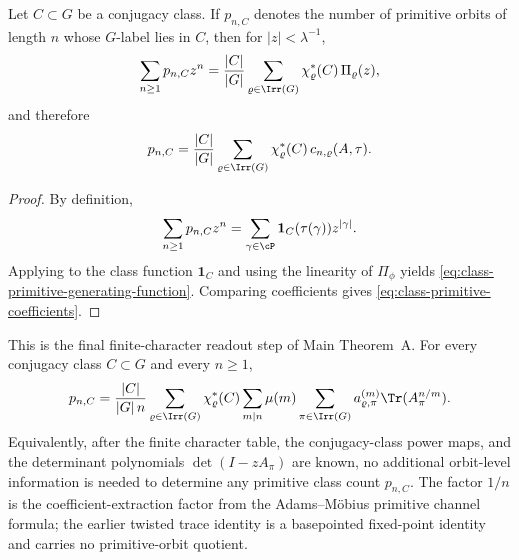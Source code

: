 \begin{proposition}
  \label{prop:class-primitive-decomposition}
  Let \(C\subset G\) be a conjugacy class. If \(p_{n,C}\) denotes the
  number of primitive orbits of length \(n\) whose \(G\)-label lies in
  \(C\), then for \(|z|<\lambda^{-1}\),
  \begin{equation}\label{eq:class-primitive-generating-function}
    \sum_{n\ge 1}p_{n,C}z^n
    =
    \frac{|C|}{|G|}
      \sum_{\varrho\in\Irr(G)}
        \chi_\varrho^\ast(C)\,\Pi_\varrho(z),
  \end{equation}
  and therefore
  \begin{equation}\label{eq:class-primitive-coefficients}
    p_{n,C}
    =
    \frac{|C|}{|G|}
      \sum_{\varrho\in\Irr(G)}
        \chi_\varrho^\ast(C)\,c_{n,\varrho}(A,\tau).
  \end{equation}
\end{proposition}

\begin{proof}
  By definition,
  \[
    \sum_{n\ge 1}p_{n,C}z^n
    =
    \sum_{\gamma\in\cP}\mathbf 1_C(\tau(\gamma))z^{|\gamma|}.
  \]
  Applying  to the class function
  \(\mathbf 1_C\) and using the linearity of \(\Pi_\phi\) yields
  \eqref{eq:class-primitive-generating-function}. Comparing coefficients
  gives \eqref{eq:class-primitive-coefficients}.
\end{proof}

\begin{theorem}
  \label{thm:class-count-trace-recovery}
  \label{thm:class-count-trace-readout}
  This is the final finite-character readout step of Main Theorem~A.  For
  every conjugacy class \(C\subset G\) and every \(n\ge 1\),
  \begin{equation}\label{eq:class-artin-mobius-trace}
    p_{n,C}
    =
    \frac{|C|}{|G|\,n}
      \sum_{\varrho\in\Irr(G)}
        \chi_\varrho^\ast(C)
        \sum_{m\mid n}\mu(m)
          \sum_{\pi\in\Irr(G)}
            a_{\varrho,\pi}^{(m)}
            \Tr(A_\pi^{n/m}).
  \end{equation}
  Equivalently, after the finite character table, the conjugacy-class
  power maps, and the determinant polynomials \(\det(I-zA_\pi)\) are
  known, no additional orbit-level information is needed to determine
  any primitive class count \(p_{n,C}\).  The factor \(1/n\) is the
  coefficient-extraction factor from the Adams--M\"obius primitive channel
  formula; the earlier twisted trace identity is a basepointed fixed-point
  identity and carries no primitive-orbit quotient.
\end{theorem}

